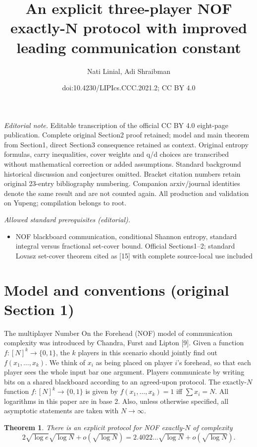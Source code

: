 \documentclass[10pt,a4paper]{article}
\title{An explicit three-player NOF exactly-N protocol with improved leading communication constant}
\author{Nati Linial, Adi Shraibman}
\date{doi:10.4230/LIPIcs.CCC.2021.2; CC BY 4.0}
\newtheorem{theorem}{Theorem}
\begin{document}
\maketitle
\noindent\textit{Editorial note.} Editable transcription of the official CC BY 4.0 eight-page publication. Complete original Section2 proof retained; model and main theorem from Section1, direct Section3 consequence retained as context. Original entropy formulas, carry inequalities, cover weights and q/d choices are transcribed without mathematical correction or added assumptions. Standard background historical discussion and conjectures omitted. Bracket citation numbers retain original 23-entry bibliography numbering. Companion arxiv/journal identities denote the same result and are not counted again. All production and validation on Yupeng; compilation belongs to root.\par\medskip
\noindent\textit{Allowed standard prerequisites (editorial).}\begin{itemize}
\item NOF blackboard communication, conditional Shannon entropy, standard integral versus fractional set-cover bound. Official Sections1–2; standard Lovasz set-cover theorem cited as [15] with complete source-local use included
\end{itemize}\medskip
\section*{Model and conventions (original Section 1)}
The multiplayer Number On the Forehead (NOF) model of communication complexity was introduced by Chandra, Furst and Lipton [9]. Given a function $f:[N]^k\to\{0,1\}$, the $k$ players in this scenario should jointly find out $f(x_1,\ldots,x_k)$. We think of $x_i$ as being placed on player $i$'s forehead, so that each player sees the whole input bar one argument. Players communicate by writing bits on a shared blackboard according to an agreed-upon protocol.
The exactly-$N$ function $f:[N]^k\to\{0,1\}$ is given by $f(x_1,\ldots,x_k)=1$ iff $\sum x_i=N$.
All logarithms in this paper are in base 2. Also, unless otherwise specified, all asymptotic statements are taken with $N\to\infty$.
\begin{theorem}\label{main}
There is an explicit protocol for NOF exactly-$N$ of complexity
\begin{equation}\label{eq:main}
2\sqrt{\log e}\sqrt{\log N}+o(\sqrt{\log N})=2.4022\ldots\sqrt{\log N}+o(\sqrt{\log N}).\tag{2}
\end{equation}
\end{theorem}
\end{document}
